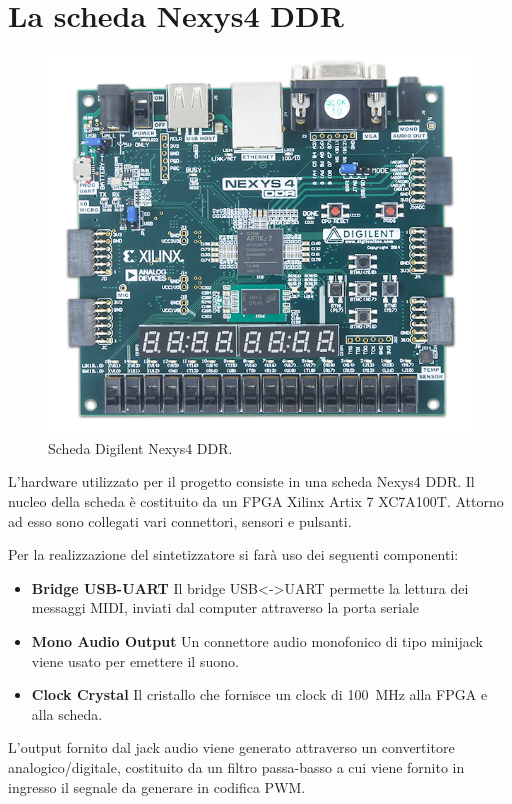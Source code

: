 \chapter{La scheda Nexys4 DDR}

\begin{figure}[h!]
	\centering
	\def\svgwidth{\columnwidth}
	\includegraphics[width=0.6\columnwidth]{TeX_files/nexys4_ddr.png}
    \caption{Scheda Digilent Nexys4 DDR.}
\end{figure}

L'hardware utilizzato per il progetto consiste in una scheda Nexys4 DDR.
Il nucleo della scheda è costituito da un FPGA Xilinx Artix 7 XC7A100T.
Attorno ad esso sono collegati vari connettori, sensori e pulsanti\cite{nexys4referencemanual}.

Per la realizzazione del sintetizzatore si farà uso dei seguenti componenti:
\begin{itemize}
    \item \textbf{Bridge USB-UART} Il bridge USB<->UART permette la lettura
          dei messaggi MIDI, inviati dal computer attraverso la porta seriale
    \item \textbf{Mono Audio Output} Un connettore audio monofonico di tipo minijack 
          viene usato per emettere il suono.
    \item \textbf{Clock Crystal} Il cristallo che fornisce un clock di \SI{100}{\mega\hertz}
          alla FPGA e alla scheda.
\end{itemize}

L'output fornito dal jack audio viene generato attraverso un convertitore analogico/digitale,
costituito da un filtro passa-basso a cui viene fornito in ingresso il segnale
da generare in codifica PWM.

